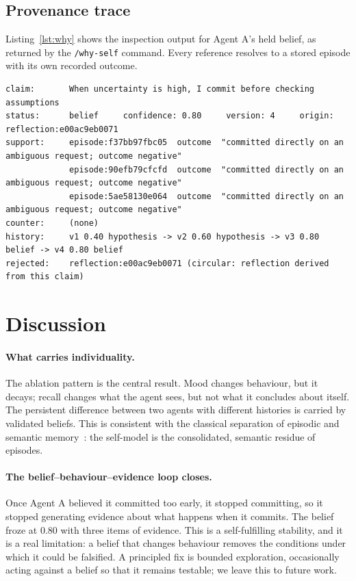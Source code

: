 \documentclass[11pt]{article}
\begin{document}
\subsection{Provenance trace}
Listing~\ref{lst:why} shows the inspection output for Agent A's held belief, as returned by the \texttt{/why-self} command. Every reference resolves to a stored episode with its own recorded outcome.
\begin{lstlisting}[caption={Provenance of a held belief (reference brain, abridged).},label={lst:why}]
claim:       When uncertainty is high, I commit before checking assumptions
status:      belief     confidence: 0.80     version: 4     origin: reflection:e00ac9eb0071
support:     episode:f37bb97fbc05  outcome  "committed directly on an ambiguous request; outcome negative"
             episode:90efb79cfcfd  outcome  "committed directly on an ambiguous request; outcome negative"
             episode:5ae58130e064  outcome  "committed directly on an ambiguous request; outcome negative"
counter:     (none)
history:     v1 0.40 hypothesis -> v2 0.60 hypothesis -> v3 0.80 belief -> v4 0.80 belief
rejected:    reflection:e00ac9eb0071 (circular: reflection derived from this claim)
\end{lstlisting}

\FloatBarrier
\section{Discussion}
\paragraph{What carries individuality.} The ablation pattern is the central result. Mood changes behaviour, but it decays; recall changes what the agent sees, but not what it concludes about itself. The persistent difference between two agents with different histories is carried by validated beliefs. This is consistent with the classical separation of episodic and semantic memory~\cite{tulving1972episodic}: the self-model is the consolidated, semantic residue of episodes.

\paragraph{The belief--behaviour--evidence loop closes.} Once Agent A believed it committed too early, it stopped committing, so it stopped generating evidence about what happens when it commits. The belief froze at 0.80 with three items of evidence. This is a self-fulfilling stability, and it is a real limitation: a belief that changes behaviour removes the conditions under which it could be falsified. A principled fix is bounded exploration, occasionally acting against a belief so that it remains testable; we leave this to future work.
\end{document}
